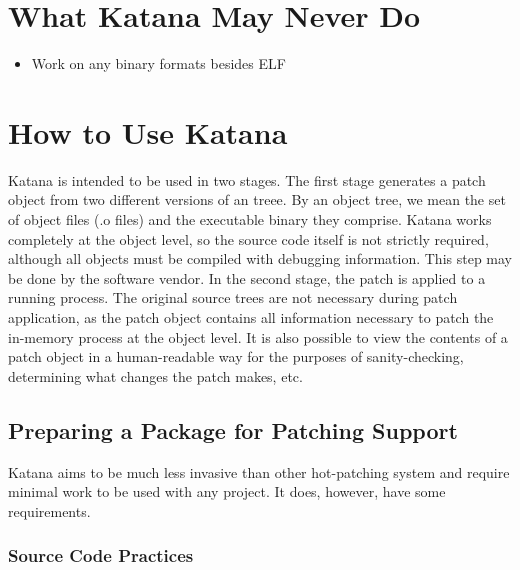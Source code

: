 \documentclass[11pt]{article}
\begin{document}
\section{What Katana May Never Do}
\label{sec-5}

\begin{itemize}
\item Work on any binary formats besides ELF
\end{itemize}
\section{How to Use Katana}
\label{sec-6}

  Katana is intended to be used in two stages. The first stage
  generates a patch object from two different versions of an
  treee. By an object tree, we mean the set of object files (.o files)
  and the executable binary they comprise. Katana works completely at
  the object level, so the source code itself is not strictly
  required, although all objects must be compiled with debugging
  information. This step may be done by the software vendor. In the
  second stage, the patch is applied to a running process. The
  original source trees are not necessary during patch application, as
  the patch object contains all information necessary to patch the
  in-memory process at the object level. It is also possible to view
  the contents of a patch object in a human-readable way for the
  purposes of sanity-checking, determining what changes the patch
  makes, etc.
\subsection{Preparing a Package for Patching Support}
\label{sec-6.1}

    Katana aims to be much less invasive than other hot-patching system
    and require minimal work to be used with any project. It does,
    however, have some requirements.\\
\subsubsection{Source Code Practices}
\label{sec-6.1.1}
\end{document}
